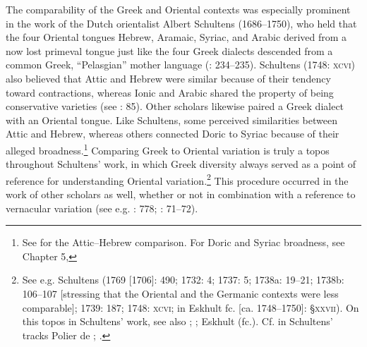 \documentclass[output=paper]{langsci/langscibook}
\begin{document}
The comparability of the Greek and Oriental contexts was especially prominent in the work of the Dutch orientalist Albert Schultens (1686–1750), who held that the four Oriental tongues Hebrew, Aramaic, Syriac, and Arabic derived from a now lost primeval tongue just like the four Greek dialects descended from a common Greek, “Pelasgian” mother language (\citealt{Schultens1739}: 234–235). Schultens (1748: \textsc{xcvi)} also believed that Attic and Hebrew were similar because of their tendency toward contractions, whereas Ionic and Arabic shared the property of being conservative varieties (see \citealt{Eskhult2015}: 85). Other scholars likewise paired a Greek dialect with an Oriental tongue. Like Schultens, some perceived similarities between Attic and Hebrew, whereas others connected Doric to Syriac because of their alleged broadness.\footnote{See \citet[425-432]{Lakemacher1730} for the Attic–Hebrew comparison. For Doric and Syriac broadness, see Chapter 5, } Comparing Greek to Oriental variation is truly a topos throughout Schultens’ work, in which Greek diversity always served as a point of reference for understanding Oriental variation.\footnote{See e.g. Schultens (1769 [1706]: 490; 1732: 4; 1737: 5; 1738a: 19–21; 1738b: 106–107 [stressing that the Oriental and the Germanic contexts were less comparable]; 1739: 187; 1748: \textsc{xcvi}; in Eskhult fc. [ca. 1748–1750]: §\textsc{xxvii}). On this topos in Schultens’ work, see also \citet[105]{Fück1955}; \citet[707]{Covington1979}; Eskhult (fc.). Cf. in Schultens’ tracks Polier de \citet[5]{Bottens1739}; \citet{GroddeckTreuge1747}.} This procedure occurred in the work of other scholars as well, whether or not in combination with a reference to vernacular variation (see e.g. \citealt{Bochart1646}: 778; \citealt{Blount1680}: 71–72).
\end{document}
